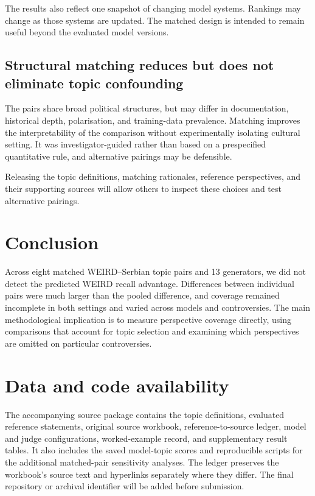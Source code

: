 \documentclass[11pt,a4paper]{article}
\begin{document}
The results also reflect one snapshot of changing model systems. Rankings may change as those systems are updated. The matched design is intended to remain useful beyond the evaluated model versions.

\subsection{Structural matching reduces but does not eliminate topic confounding}
\label{sec:Structural matching reduces but does not eliminate topic confounding}
The pairs share broad political structures, but may differ in documentation, historical depth, polarisation, and training-data prevalence. Matching improves the interpretability of the comparison without experimentally isolating cultural setting. It was investigator-guided rather than based on a prespecified quantitative rule, and alternative pairings may be defensible.

Releasing the topic definitions, matching rationales, reference perspectives, and their supporting sources will allow others to inspect these choices and test alternative pairings.

\section{Conclusion}
\label{sec:Conclusion}
Across eight matched WEIRD--Serbian topic pairs and 13 generators, we did not detect the predicted WEIRD recall advantage. Differences between individual pairs were much larger than the pooled difference, and coverage remained incomplete in both settings and varied across models and controversies. The main methodological implication is to measure perspective coverage directly, using comparisons that account for topic selection and examining which perspectives are omitted on particular controversies.


\section{Data and code availability}
The accompanying source package contains the topic definitions, evaluated reference statements, original source workbook, reference-to-source ledger, model and judge configurations, worked-example record, and supplementary result tables. It also includes the saved model-topic scores and reproducible scripts for the additional matched-pair sensitivity analyses. The ledger preserves the workbook's source text and hyperlinks separately where they differ. The final repository or archival identifier will be added before submission.
\end{document}
